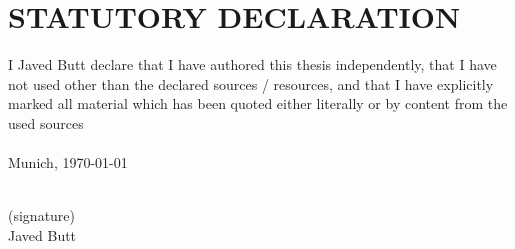 

\chapter*{STATUTORY DECLARATION}

I Javed Butt declare that I have authored this thesis independently, that I have not used other than the declared
sources / resources, and that I have explicitly marked all material which has been quoted either
literally or by content from the used sources\\
\\
Munich, \today\\
\\
\begin{center}
(signature)
\\
Javed Butt
\end{center}

